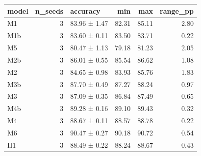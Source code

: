 \begin{tabular}{lrlrrr}
\toprule
model & n\_seeds & accuracy & min & max & range\_pp \\
\midrule
M1 & 3 & 83.96 ± 1.47 & 82.31 & 85.11 & 2.80 \\
M1b & 3 & 83.60 ± 0.11 & 83.50 & 83.71 & 0.22 \\
M5 & 3 & 80.47 ± 1.13 & 79.18 & 81.23 & 2.05 \\
M2b & 3 & 86.01 ± 0.55 & 85.54 & 86.62 & 1.08 \\
M2 & 3 & 84.65 ± 0.98 & 83.93 & 85.76 & 1.83 \\
M3b & 3 & 87.70 ± 0.49 & 87.27 & 88.24 & 0.97 \\
M3 & 3 & 87.09 ± 0.35 & 86.84 & 87.49 & 0.65 \\
M4b & 3 & 89.28 ± 0.16 & 89.10 & 89.43 & 0.32 \\
M4 & 3 & 88.67 ± 0.11 & 88.57 & 88.78 & 0.22 \\
M6 & 3 & 90.47 ± 0.27 & 90.18 & 90.72 & 0.54 \\
H1 & 3 & 88.49 ± 0.22 & 88.24 & 88.67 & 0.43 \\
\bottomrule
\end{tabular}
